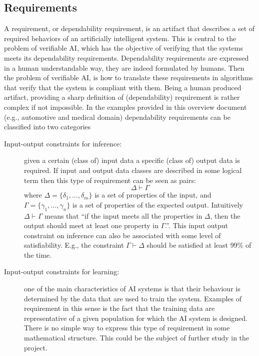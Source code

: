 \subsection{Requirements}
A requirement, or dependability requirement, is an artifact that
describes a set of required behaviors of an artificially intelligent
system. This is central to the problem of verifiable AI, which has the
objective of verifying that the systems meets its dependability
requirements. 
Dependability requirements are expressed in a human understandable
way, they are indeed formulated by humans. Then the problem of
verifiable AI, is how to translate these requirements in algorithms
that verify that the system is compliant with them. 
Being a human produced artifact, providing a sharp definition of
(dependability) requirement is rather complex if not impossible. In
the examples provided in this overview document (e.g., automotive and
medical domain) dependability requirements can be classified into two
categories 
\begin{description}
\item[Input-output constraints for inference:] given a certain (class of) input data
  a specific (class of) output data is required. If input and output
  data classes are described in some logical term then this type of
  requirement can be seen as pairs: 
$$
\Delta\vdash\Gamma 
$$
where $\Delta=\{\delta_1,\dots,\delta_m\}$ is a set of properties of
the input, and $\Gamma=\{\gamma_1,\dots,\gamma_n\}$ is a set of
properties of the expected output. Intuitively $ \Delta\vdash\Gamma $
means that ``if the input meets all the properties in $\Delta$, then
the output should meet at least one property in $\Gamma$.''.  This
input output constraint on inference can also be associated with some
level of satisfiability. E.g., the constraint $\Gamma\vdash\Delta$
should be satisfied at least 99\% of the time.

\item[Input-output constraints for learning:] one of the main
  characteristics of AI systems is that their behaviour is determined
  by the data that are used to train the system. Examples of
  requirement in this sense is the fact that the training data are
  representative of a given population for which the AI system is
  designed. There is no simple way to express this type of requirement
  in some mathematical structure. This could be the subject of further
  study in the project. 
\end{description}

